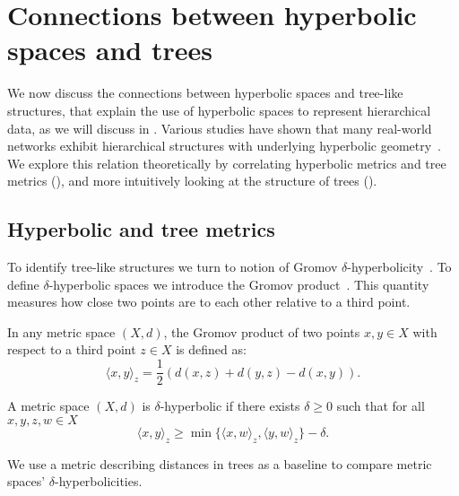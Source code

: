 \section{Connections between hyperbolic spaces and trees}\label{sec:hyperbolicAndTrees}
We now discuss the connections between hyperbolic spaces and tree-like structures, that explain the use of hyperbolic spaces to represent hierarchical data, as we will discuss in . Various studies have shown that many real-world networks exhibit hierarchical structures with underlying hyperbolic geometry~\cite{Krioukov2010HyperbolicGeometryComplexNetworks}\cite{Papadopoulos2012popularityVSSimilarityGrowingNetworks}. We explore this relation theoretically by correlating hyperbolic metrics and tree metrics (), and more intuitively looking at the structure of trees ().

\subsection{Hyperbolic and tree metrics}\label{sec:hyperbolicTreeMetrics}
To identify tree-like structures we turn to notion of Gromov $\delta$-hyperbolicity~\cite{gromov1987hyperbolic}\cite{adcock2013tree}\cite{chen2013hyperbolicity}. To define $\delta$-hyperbolic spaces we introduce the Gromov product~\cite{gromov1987hyperbolic}. This quantity measures how close two points are to each other relative to a third point.  

\begin{definition}
    In any metric space $(X,d)$, the Gromov product of two points $x,y\in X$ with respect to a third point $z\in X$ is defined as:
    \begin{equation*}
        \langle x,y \rangle_z = \frac{1}{2}\left(d(x,z) + d(y,z) - d(x,y)\right).
    \end{equation*}
\end{definition}

\begin{definition}
    A metric space $(X,d)$ is $\delta$-hyperbolic if there exists $\delta\geq0$ such that for all $x,y,z,w\in X$
    \begin{equation*}
        \langle x,y\rangle_z \geq \min\{\langle x,w\rangle_z, \langle y, w\rangle_z\} - \delta.
    \end{equation*}
\end{definition}

We use a metric describing distances in trees as a baseline to compare metric spaces' $\delta$-hyperbolicities.

